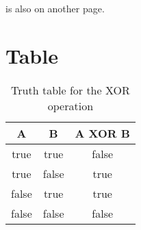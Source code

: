  is also on another page.

\section{Table}
\label{sec:table}

\begin{table}[H]
    \centering
    \begin{tabular}{| c | c | c |}
        \hline
        A & B & A XOR B \\
        \hline\hline
        true  & true  & false \\
        true  & false & true  \\
        false & true  & true  \\
        false & false & false \\
        \hline
    \end{tabular}
    \caption{Truth table for the XOR operation}
    \label{tab:xor_truth_table}
\end{table}